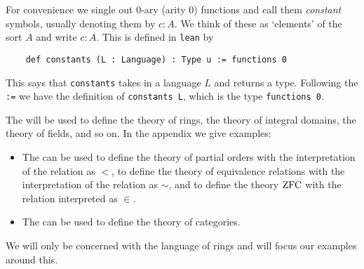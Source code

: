 \begin{dfn}[Language]
  For convenience we single out $0$-ary (arity $0$) functions and
  call them \textit{constant} symbols, usually denoting them by $c : A$.
  We think of these as `elements' of the sort $A$ and write $c : A$.
  This is defined in \texttt{lean} by

  \begin{lstlisting}
    def constants (L : Language) : Type u := functions 0\end{lstlisting}

  This says that \texttt{constants} takes in a language $L$ and returns a type.
  Following the \texttt{:=} we have the definition of \texttt{constants L},
  which is the type \texttt{functions 0}.
\end{dfn}

\begin{eg}
  The 
  will be used to define the theory of rings,
  the theory of integral domains, the theory of fields, and so on.
  In the appendix we give examples:
  \begin{itemize}
    \item The  %
          can be used to define the theory of partial orders
          with the interpretation of the relation as $<$,
          to define the theory of equivalence relations with the
          interpretation of the relation as $\sim$,
          and to define the theory $\operatorname{ZFC}$ with the relation interpreted as $\in$.
    \item The  %
          can be used to define the theory of categories.
  \end{itemize}
  We will only be concerned with the language of rings and will
  focus our examples around this.
\end{eg}

